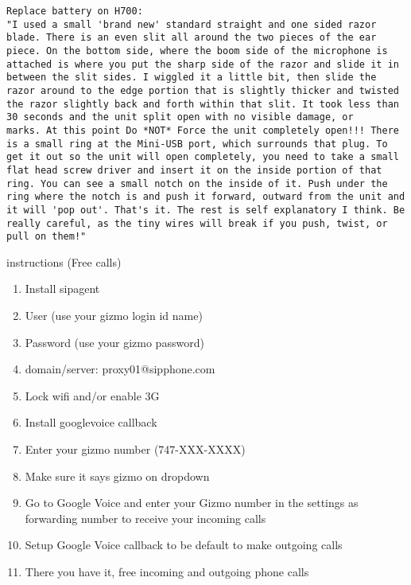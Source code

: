 \documentclass[12pt,twoside]{article}
\begin{document}
\begin{verbatim}
Replace battery on H700:
"I used a small 'brand new' standard straight and one sided razor
blade. There is an even slit all around the two pieces of the ear
piece. On the bottom side, where the boom side of the microphone is
attached is where you put the sharp side of the razor and slide it in
between the slit sides. I wiggled it a little bit, then slide the
razor around to the edge portion that is slightly thicker and twisted
the razor slightly back and forth within that slit. It took less than
30 seconds and the unit split open with no visible damage, or
marks. At this point Do *NOT* Force the unit completely open!!! There
is a small ring at the Mini-USB port, which surrounds that plug. To
get it out so the unit will open completely, you need to take a small
flat head screw driver and insert it on the inside portion of that
ring. You can see a small notch on the inside of it. Push under the
ring where the notch is and push it forward, outward from the unit and
it will 'pop out'. That's it. The rest is self explanatory I think. Be
really careful, as the tiny wires will break if you push, twist, or
pull on them!" 
\end{verbatim}

 instructions (Free  calls)
\begin{enumerate}
\item Install sipagent
\item User (use your gizmo login id name)
\item Password (use your gizmo password)
\item domain/server: proxy01@sipphone.com
\item Lock wifi and/or enable 3G
\item Install googlevoice callback
\item Enter your gizmo number (747-XXX-XXXX)
\item Make sure it says gizmo on dropdown
\item Go to Google Voice and enter your Gizmo number in the settings as forwarding number to receive your incoming calls
\item Setup Google Voice callback to be default to make outgoing calls
\item There you have it, free incoming and outgoing phone calls
\end{enumerate}
\end{document}
